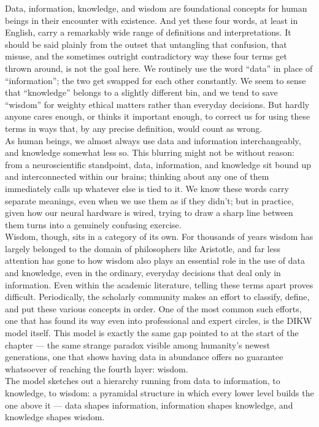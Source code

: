 Data, information, knowledge, and wisdom are foundational concepts for human beings in their encounter with existence. And yet these four words, at least in English, carry a remarkably wide range of definitions and interpretations. It should be said plainly from the outset that untangling that confusion, that misuse, and the sometimes outright contradictory way these four terms get thrown around, is not the goal here. We routinely use the word ``data'' in place of ``information''; the two get swapped for each other constantly. We seem to sense that ``knowledge'' belongs to a slightly different bin, and we tend to save ``wisdom'' for weighty ethical matters rather than everyday decisions. But hardly anyone cares enough, or thinks it important enough, to correct us for using these terms in ways that, by any precise definition, would count as wrong.\\
As human beings, we almost always use data and information interchangeably, and knowledge somewhat less so. This blurring might not be without reason: from a neuroscientific standpoint, data, information, and knowledge sit bound up and interconnected within our brains\autocite{seung2012}; thinking about any one of them immediately calls up whatever else is tied to it. We know these words carry separate meanings, even when we use them as if they didn't; but in practice, given how our neural hardware is wired, trying to draw a sharp line between them turns into a genuinely confusing exercise.\\
Wisdom, though, sits in a category of its own. For thousands of years wisdom has largely belonged to the domain of philosophers like Aristotle\autocite{aristotle2020}, and far less attention has gone to how wisdom also plays an essential role in the use of data and knowledge, even in the ordinary, everyday decisions that deal only in information. Even within the academic literature, telling these terms apart proves difficult. Periodically, the scholarly community makes an effort to classify, define, and put these various concepts in order. One of the most common such efforts, one that has found its way even into professional and expert circles, is the DIKW model itself. This model is exactly the same gap pointed to at the start of the chapter --- the same strange paradox visible among humanity's newest generations, one that shows having data in abundance offers no guarantee whatsoever of reaching the fourth layer: wisdom.\\
The model sketches out a hierarchy running from data to information, to knowledge, to wisdom: a pyramidal structure in which every lower level builds the one above it --- data shapes information, information shapes knowledge, and knowledge shapes wisdom.

